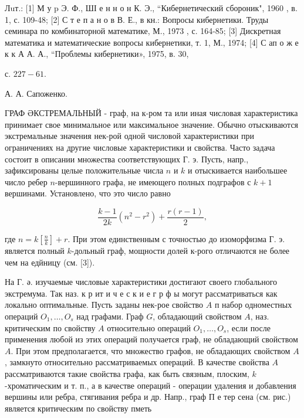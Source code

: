 \documentclass[10pt]{article}
\begin{document}
Лuт.: [1] М у p Э. Ф., ШІ е н н о н К. Э., “Кибернетический сбороник", 1960 , в. 1, с. 109-48; [2] С т е п а н о в В. Е., в кн.: Вопросы кибернетики. Труды семинара по комбинаторной математике, М., 1973 , с. 164-85; [3] Дискретная математика и математические вопросы кибернетики, т. 1, М., 1974; [4] С ап о ж е к к А А. А., “Проблемы кибернетики», 1975, в. 30,

с. $227-61$.

А. А. Сапоженко.



ГРАФ ӘКСТРЕМАЛЬНЫЙ - граф, на к-ром та или иная числовая характеристика принимает свое минимальное или максимальное значение. Обычно отыскиваются экстремальные значения нек-рой одной числовой характеристики при ограничениях на другие числовые характеристики и свойства. Часто задача состоит в описании множества соответствующих Г. э. Пусть, напр., зафиксированы целые положительные числа $n$ и $k$ и отыскивается наибольшее число ребер $n$-вершинного графа, не имеющего полных подграфов с $k+1$ вершинами. Установлено, что это число равно



\[

\frac{k-1}{2 k}\left(n^{2}-r^{2}\right)+\frac{r(r-1)}{2},

\]



где $n=k\left[\frac{n}{k}\right]+r$. При этом единственным с точностью до изоморфизма Г. э. является полный $k$-дольный граф, мощности долей к-рого отличаются не более чем на едйницу (см. [3]).



На Г. ә. изучаемые числовые характеристики достигают своего глобального экстремума. Так наз. к р ит и ч е с к и е г р ф ы могут рассматриваться как локально оптимальные. Пусть заданы нек-рое свойство $A$ п набор одноместных операций $O_{1}, \ldots, O_{s}$ над графами. Граф $G$, обладающий свойством $A$, наз. критическим по свойству $A$ относительно операций $O_{1}, \ldots, O_{s}$, если после применения любой из этих операций получается граф, не обладающий свойством $A$. При этом предполагается, что множество графов, не обладающих свойством $A$, замкнуто относительно рассматриваемых операций. В качестве свойства $A$ рассматриваются такие свойства графа, как быть связным, плоским, $k$-хроматическим и т. п., а в качестве операций - операции удаления и добавления вершины или ребра, стягивания ребра и др. Напр., граф П е тер сена (см. рис.) является критическим по свойству пметь
\end{document}
